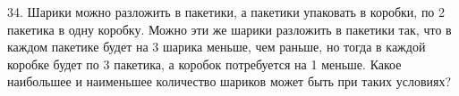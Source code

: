 34. Шарики можно разложить в пакетики, а пакетики упаковать в коробки, по 2 пакетика в одну коробку. Можно эти же шарики разложить в пакетики так, что в каждом пакетике будет на 3 шарика меньше, чем раньше, но тогда в каждой коробке будет по 3 пакетика, а коробок потребуется на 1 меньше. Какое наибольшее и наименьшее количество шариков может быть при таких условиях?\\
